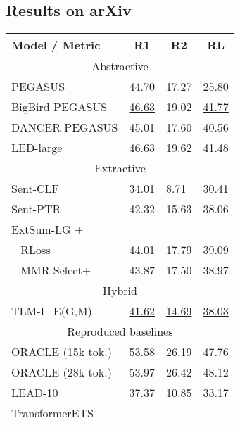 \documentclass[11pt]{article}
\begin{document}
\subsection{Results on arXiv}
\label{subsec:Results on arXiv}

\begin{table}[ht]
\fontsize{9}{9}
\selectfont
\centering
\begin{tabular}[t]{@{}llll@{}}
\toprule
Model  / Metric  & \multicolumn{1}{c}{R1} & \multicolumn{1}{c}{R2} & \multicolumn{1}{c}{RL} \\ \midrule
\multicolumn{4}{c}{Abstractive }               \\ \midrule
PEGASUS \citeyearpar{zhang2019pegasus}                & 44.70  & 17.27 & 25.80  \\
BigBird PEGASUS \citeyearpar{bigbird}        & \underline{46.63} & 19.02 & \underline{41.77} \\
DANCER  PEGASUS \citeyearpar{dancer2020}       & 45.01 & 17.60  & 40.56 \\
LED-large \citeyearpar{longformer}    & \underline{46.63} & \underline{19.62} & 41.48 \\ \midrule
\multicolumn{4}{c}{Extractive }                \\ \midrule
Sent-CLF \citeyearpar{pilault-etal-2020-extractive}              & 34.01 & 8.71  & 30.41 \\
Sent-PTR \citeyearpar{pilault-etal-2020-extractive}              & 42.32 & 15.63 & 38.06 \\
ExtSum-LG + \citeyearpar{xiao-carenini-2020-systematically}  &&&\\
~ RLoss & \underline{44.01} & \underline{17.79} & \underline{39.09} \\
~ MMR-Select+  & 43.87 & 17.50  & 38.97 \\ \midrule
\multicolumn{4}{c}{Hybrid }                    \\ \midrule
TLM-I+E(G,M) \citeyearpar{pilault-etal-2020-extractive}       & \underline{41.62} & \underline{14.69} & \underline{38.03} \\\midrule
\multicolumn{4}{c}{Reproduced baselines}                              \\ \midrule
ORACLE (15k tok.)   & 53.58    & 26.19   & 47.76   \\
ORACLE (28k tok.)    & 53.97    & 26.42   & 48.12   \\
LEAD-10                     & 37.37    & 10.85   & 33.17   \\
TransformerETS   & & & \\

\end{tabular}
\end{table}
\end{document}
